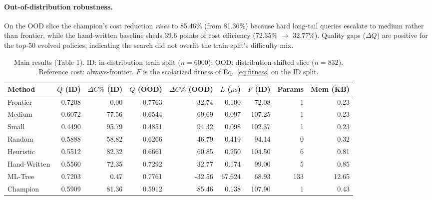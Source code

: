 \documentclass[11pt]{article}
\begin{document}
\paragraph{Out-of-distribution robustness.} On the OOD slice the champion's cost reduction \emph{rises} to 85.46\% (from 81.36\%) because hard long-tail queries escalate to medium rather than frontier, while the hand-written baseline sheds 39.6 points of cost efficiency (72.35\% $\to$ 32.77\%). Quality gaps ($\Delta Q$) are positive for the top-50 evolved policies, indicating the search did not overfit the train split's difficulty mix.
\begin{table}[t]\centering
  \footnotesize\setlength{\tabcolsep}{4.5pt}
\caption{Main results (Table 1). ID: in-distribution train split ($n{=}6000$); OOD: distribution-shifted slice ($n{=}832$). Reference cost: always-frontier. $F$ is the scalarized fitness of Eq.~\eqref{eq:fitness} on the ID split.}
\label{tab:main}
\begin{tabular}{lrrrrrrrr}\toprule
Method & $Q$ (ID) & $\Delta C\%$ (ID) & $Q$ (OOD) & $\Delta C\%$ (OOD) & $L$ ($\mu\text{s}$) & $F$ (ID) & Params & Mem (KB)\\\midrule
Frontier & 0.7208 & 0.00 & 0.7763 & -32.74 & 0.100 & 72.08 & 1 & 0.23\\
Medium & 0.6072 & 77.56 & 0.6544 & 69.69 & 0.097 & 107.25 & 1 & 0.23\\
Small & 0.4490 & 95.79 & 0.4851 & 94.32 & 0.098 & 102.37 & 1 & 0.23\\
Random & 0.5888 & 58.82 & 0.6266 & 46.79 & 0.419 & 94.14 & 0 & 0.32\\
Heuristic & 0.5512 & 82.32 & 0.6661 & 60.85 & 0.250 & 104.50 & 6 & 0.81\\
Hand-Written & 0.5560 & 72.35 & 0.7292 & 32.77 & 0.174 & 99.00 & 5 & 0.85\\
ML-Tree & 0.7203 & 0.47 & 0.7761 & -32.56 & 67.624 & 68.93 & 133 & 12.65\\
Champion & 0.5909 & 81.36 & 0.5912 & 85.46 & 0.138 & 107.90 & 1 & 0.43\\
\bottomrule\end{tabular}\end{table}
\end{document}
